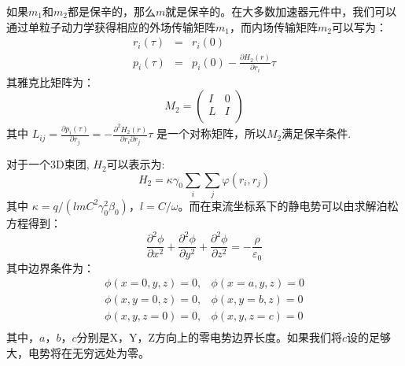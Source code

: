 {如果$ {{m} _ {1}} $和$ {{m} _ {2}} $都是保辛的，那么$ m $就是保辛的。在大多数加速器元件中，我们可以通过单粒子动力学获得相应的外场传输矩阵$ {{m} _ {1}} $，而内场传输矩阵$ {{m} _ {2}} $可以写为：
\begin{eqnarray}
 {{r}_{i}}(\tau ) &=& {{r}_{i}}(0) \\
 {{p}_{i}}(\tau ) &=& {{p}_{i}}(0)-\frac{\partial {{H}_{2}}(r)}{\partial {{r}_{i}}}\tau
\end{eqnarray}
其雅克比矩阵为：
\begin{equation}
{{M}_{2}}=\left(
\begin{array}{cc}
   I & 0  \\
   L & I  \\
\end{array} \right)
\end{equation}
其中
${{L}_{ij}}=\frac{\partial {{p}_{i}}(\tau )}{\partial {{r}_{j}}}=-\frac{{{\partial }^{2}}{{H}_{2}}(r)}{\partial {{r}_{i}}\partial {{r}_{j}}}\tau$
是一个对称矩阵，所以${{M}_{2}}$满足保辛条件.

对于一个3D束团, ${{H}_{2}}$可以表示为:
\begin{equation}
{{H}_{2}}=\kappa {{\gamma }_{0}}\sum\limits_{i}{\sum\limits_{j}{\varphi ({{r}_{i}},{{r}_{j}})}}
\end{equation}
其中 $\kappa =q/(lm{{C}^{2}}\gamma _{0}^{2}{{\beta }_{0}})$，$l=C/\omega $。而在束流坐标系下的静电势可以由求解泊松方程得到：
\begin{equation}
\frac{{{\partial }^{2}}\phi }{\partial {{x}^{2}}}+\frac{{{\partial }^{2}}\phi }{\partial {{y}^{2}}}+\frac{{{\partial }^{2}}\phi }{\partial {{z}^{2}}}=-\frac{\rho }{{{\varepsilon }_{0}}}
\end{equation}
其中边界条件为：
\begin{equation}
\begin{array}{cc}
   \phi (x=0,y,z)=0, & \phi (x=a,y,z)=0  \\
   \phi (x,y=0,z)=0, & \phi (x,y=b,z)=0  \\
   \phi (x,y,z=0)=0, & \phi (x,y,z=c)=0  \\
\end{array}
\end{equation}
其中，$a$，$b$，$c$分别是X，Y，Z方向上的零电势边界长度。如果我们将$c$设的足够大，电势将在无穷远处为零。

}
